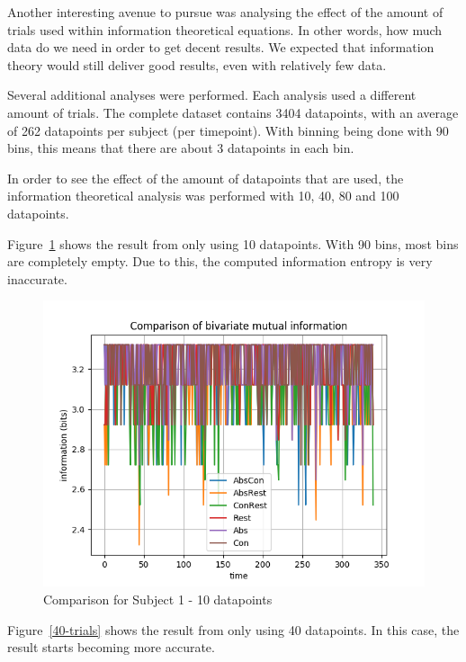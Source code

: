 Another interesting avenue to pursue was analysing the effect of the amount of trials used within information theoretical equations. In other words, how much data do we need in order to get decent results. We expected that information theory would still deliver good results, even with relatively few data.

Several additional analyses were performed. Each analysis used a different amount of trials. The complete dataset contains 3404 datapoints, with an average of 262 datapoints per subject (per timepoint). With binning being done with 90 bins, this means that there are about 3 datapoints in each bin. 

In order to see the effect of the amount of datapoints that are used, the information theoretical analysis was performed with 10, 40, 80 and 100 datapoints. 

Figure~\ref{10-trials} shows the result from only using 10 datapoints. With 90 bins, most bins are completely empty. Due to this, the computed information entropy is very inaccurate. 

\begin{figure}[!htb]
\caption{Comparison for Subject 1 - 10 datapoints}
\label{10-trials}
    \centering
    \includegraphics[width=\textwidth]{fig/subject1_10trials_all-channel-1}
\end{figure}

Figure~\ref{40-trials} shows the result from only using 40 datapoints. In this case, the result starts becoming more accurate.

